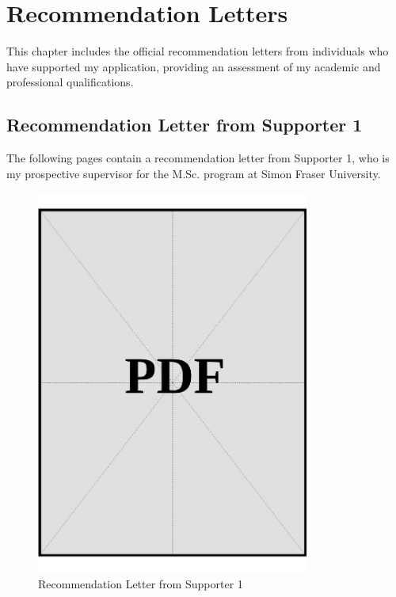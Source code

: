 
\chapter{Recommendation Letters}\label{sec:recommendation-letters}

This chapter includes the official recommendation letters from individuals who have supported my application, providing an assessment of my academic and professional qualifications.

\clearpage
\section{Recommendation Letter from Supporter 1}\label{sec:recommendation-letter-1}

The following pages contain a recommendation letter from Supporter 1, who is my prospective supervisor for the M.Sc. program at Simon Fraser University.

\begin{figure}[H]
    \centering
    \includegraphics[page=1, width=0.8\textwidth]{../docs/applicant/recommendation-letters/letter-1.pdf}
    \caption{Recommendation Letter from Supporter 1}
    \label{fig:recommendation-letter-1}
\end{figure}

